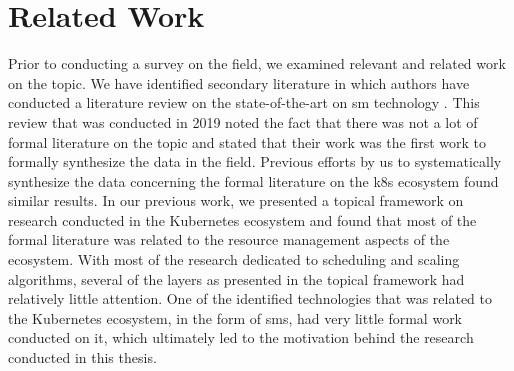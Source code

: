 \section{Related Work}
\label{sec:survey:related-work}

Prior to conducting a survey on the field, we examined relevant and related work on the topic. We have identified secondary literature in which authors have conducted a literature review on the state-of-the-art on \gls{sm} technology \cite{service-mesh-survey}. This review that was conducted in 2019 noted the fact that there was not a lot of formal literature on the topic and stated that their work was the first work to formally synthesize the data in the field. Previous efforts by us to systematically synthesize the data concerning the formal literature on the \gls{k8s} ecosystem found similar results.  In our previous work, we presented a topical framework on research conducted in the Kubernetes ecosystem and found that most of the formal literature was related to the resource management aspects of the ecosystem. With most of the research dedicated to scheduling and scaling algorithms, several of the layers as presented in the topical framework  had relatively little attention. One of the identified technologies that was related to the Kubernetes ecosystem, in the form of \glspl{sm}, had very little formal work conducted on it, which ultimately led to the motivation behind the research conducted in this thesis.

